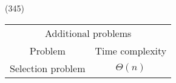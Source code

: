 \item \begin{theorem}{(345)} \quad\quad
    \begin{table}[H]
        \centering
        \begin{tabular}{|c|c|}
            \hline
            \multicolumn{2}{|c|}{Additional problems} \\
            \Xhline{3\arrayrulewidth}
            Problem & Time complexity \\
            \Xhline{2\arrayrulewidth}
            Selection problem & $\Theta(n)$ \\
            \hline
        \end{tabular}
    \end{table}
\end{theorem}


